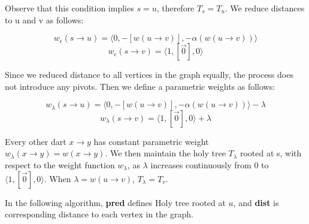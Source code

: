 \documentclass{article}
\begin{document}
Observe that this condition implies $s = u$, therefore $T_s = T_u$. We reduce 
distances to u and v as follows:

\[ w_{\epsilon}(s \rightarrow u) = \langle 0, -[w(u \rightarrow v)], 
  -\alpha(w(u \rightarrow v)) \rangle \]
\[ w_{\epsilon}(s \rightarrow v) = \langle 1, [\vec{0}], 0 \rangle \]

Since we reduced distance to all vertices in the graph equally, the process does
not introduce any pivots. Then we define a parametric weights as follows:

\[ w_{\lambda}(s \rightarrow u) = \langle 0, -[w(u \rightarrow v)], 
  -\alpha(w(u \rightarrow v)) \rangle - \lambda \]
\[ w_{\lambda}(s \rightarrow v) =  \langle 1, [\vec{0}], 0 \rangle  + \lambda \]

Every other dart $x \rightarrow y$ has constant parametric weight 
$w_{\lambda}(x \rightarrow y) = w(x \rightarrow y)$.
We then maintain the holy tree $T_{\lambda}$ rooted at s, with respect
to the weight function $w_{\lambda}$, as $\lambda$ increases continuously from
0 to $\langle 1, [\vec{0}], 0 \rangle$. When $\lambda = w(u \rightarrow v)$, 
$T_{\lambda} = T_v$.

In the following algorithm, \textbf{pred} defines Holy tree rooted at $u$, and 
\textbf{dist} is corresponding distance to each vertex in the graph. \\

\end{document}
